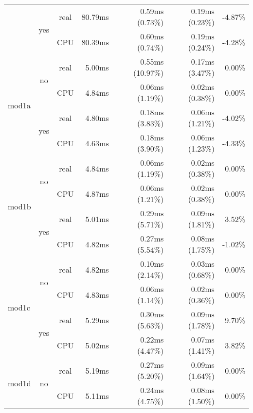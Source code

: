 \documentclass[en]{pracamgr}
\begin{document}
\begin{small}
\begin{longtable}{|l|c|c|r|r|r|r|}
                          \cline{2-7}
                          & \multirow{2}{*}{yes} & real & 80.79ms & 0.59ms (0.73\%) & 0.19ms (0.23\%) & -4.87\% \\*
                          &                      & CPU  & 80.39ms & 0.60ms (0.74\%) & 0.19ms (0.24\%) & -4.28\% \\
\hline
\multirow{4}{*}{mod1a}    & \multirow{2}{*}{no}  & real & 5.00ms & 0.55ms (10.97\%) & 0.17ms (3.47\%) & 0.00\% \\*
                          &                      & CPU  & 4.84ms & 0.06ms (1.19\%) & 0.02ms (0.38\%) & 0.00\% \\*
                          \cline{2-7}
                          & \multirow{2}{*}{yes} & real & 4.80ms & 0.18ms (3.83\%) & 0.06ms (1.21\%) & -4.02\% \\*
                          &                      & CPU  & 4.63ms & 0.18ms (3.90\%) & 0.06ms (1.23\%) & -4.33\% \\
\hline
\multirow{4}{*}{mod1b}    & \multirow{2}{*}{no}  & real & 4.84ms & 0.06ms (1.19\%) & 0.02ms (0.38\%) & 0.00\% \\*
                          &                      & CPU  & 4.87ms & 0.06ms (1.21\%) & 0.02ms (0.38\%) & 0.00\% \\*
                          \cline{2-7}
                          & \multirow{2}{*}{yes} & real & 5.01ms & 0.29ms (5.71\%) & 0.09ms (1.81\%) & 3.52\% \\*
                          &                      & CPU  & 4.82ms & 0.27ms (5.54\%) & 0.08ms (1.75\%) & -1.02\% \\
\hline
\multirow{4}{*}{mod1c}    & \multirow{2}{*}{no}  & real & 4.82ms & 0.10ms (2.14\%) & 0.03ms (0.68\%) & 0.00\% \\*
                          &                      & CPU  & 4.83ms & 0.06ms (1.14\%) & 0.02ms (0.36\%) & 0.00\% \\*
                          \cline{2-7}
                          & \multirow{2}{*}{yes} & real & 5.29ms & 0.30ms (5.63\%) & 0.09ms (1.78\%) & 9.70\% \\*
                          &                      & CPU  & 5.02ms & 0.22ms (4.47\%) & 0.07ms (1.41\%) & 3.82\% \\
\hline
\multirow{4}{*}{mod1d}    & \multirow{2}{*}{no}  & real & 5.19ms & 0.27ms (5.20\%) & 0.09ms (1.64\%) & 0.00\% \\*
                          &                      & CPU  & 5.11ms & 0.24ms (4.75\%) & 0.08ms (1.50\%) & 0.00\% \\*

\end{longtable}
\end{small}
\end{document}
